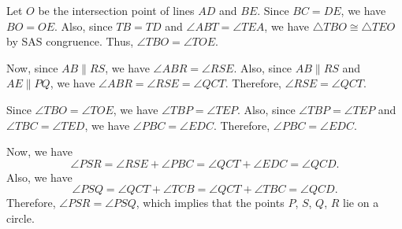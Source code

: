 Let \(O\) be the intersection point of lines \(AD\) and \(BE\). Since \(BC=DE\), we have \(BO=OE\). Also, since \(TB=TD\) and \(\angle ABT = \angle TEA\), we have \(\triangle TBO \cong \triangle TEO\) by SAS congruence. Thus, \(\angle TBO = \angle TOE\).

Now, since \(AB \parallel RS\), we have \(\angle ABR = \angle RSE\). Also, since \(AB \parallel RS\) and \(AE \parallel PQ\), we have \(\angle ABR = \angle RSE = \angle QCT\). Therefore, \(\angle RSE = \angle QCT\).

Since \(\angle TBO = \angle TOE\), we have \(\angle TBP = \angle TEP\). Also, since \(\angle TBP = \angle TEP\) and \(\angle TBC = \angle TED\), we have \(\angle PBC = \angle EDC\). Therefore, \(\angle PBC = \angle EDC\).

Now, we have
\[\angle PSR = \angle RSE + \angle PBC = \angle QCT + \angle EDC = \angle QCD.\]
Also, we have
\[\angle PSQ = \angle QCT + \angle TCB = \angle QCT + \angle TBC = \angle QCD.\]
Therefore, \(\angle PSR = \angle PSQ\), which implies that the points \(P\), \(S\), \(Q\), \(R\) lie on a circle.

